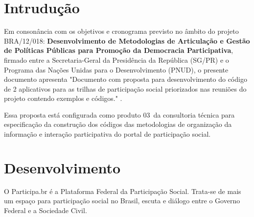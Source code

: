 \documentclass[12pt]{article}
\newcommand{\ProductNumber}{03}
\newcommand{\ProductDescription}{"Documento com proposta para desenvolvimento
        do código de 2 aplicativos para as trilhas de participação social
        priorizados nas reuniões do projeto contendo exemplos e códigos."
}
\newcommand{\PalavrasChave}{palavra1, palavra2, palavra3, etc}
\begin{document}



\tableofcontents
\newpage

\begin{abstract}
The software architecture of a computer program represents the basic structure
and the externally visible relationships of those components. The documentation
of this architecture is of great importance to monitor and evaluate the
evolution of a system and to measure their attributes of modularity as coupling
and cohesion. A tool capable of extracting this documentation automatically
enables monitor and measure these attributes during the evolution of a software
project. This paper presents the implementation of a tool for automatic
extraction of information of dependence between modules for programs written in
C/C++ with focus on attributes of modularity to monitor the evolution of the
system. At the end of this paper is done an evaluation of this
tool through a case study. \\

{\bf Palavras-chave:} \PalavrasChave.
\end{abstract}
\newpage

\section{Intrudução}

Em consonância com os objetivos e cronograma previsto no âmbito do
projeto BRA/12/018:
\textbf{Desenvolvimento de Metodologias de Articulação e Gestão de
Políticas Públicas para Promoção da Democracia Participativa},
firmado entre a Secretaria-Geral da Presidência da República
(SG/PR) e o Programa das Nações Unidas para o Desenvolvimento (PNUD),
o presente documento apresenta \ProductDescription.

Essa proposta está configurada como produto \ProductNumber~da consultoria técnica
para especificação da construção dos códigos das metodologias de
organização da informação e interação participativa do portal de
participação social.

\section{Desenvolvimento}

O Participa.br é a Plataforma Federal da Participação Social. Trata-se de mais
um espaço para participação social no Brasil, escuta e diálogo entre o Governo
Federal e a Sociedade Civil. 
\end{document}
